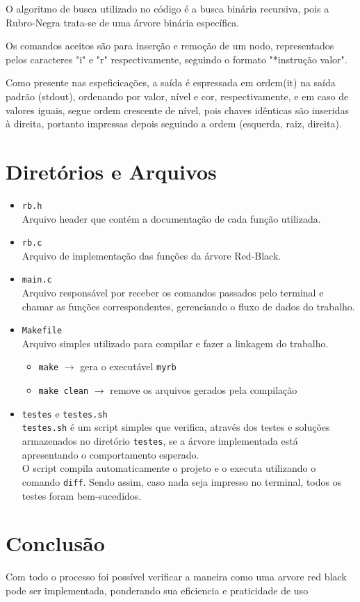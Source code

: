 \documentclass{article}
\begin{document}
    O algoritmo de busca utilizado no código é a busca binária recursiva, pois a Rubro-Negra trata-se de uma árvore binária específica. 

    Os comandos aceitos são para inserção e remoção de um nodo, representados pelos caracteres "i" e "r" respectivamente, seguindo o formato "*instrução valor". 

    Como presente nas espeficicações, a saída é espressada em ordem(it) na saída padrão (stdout), ordenando por valor, nível e cor, respectivamente, e em caso de valores iguais, segue ordem crescente de nível, pois chaves idênticas são inseridas à direita, portanto impressas depois seguindo a ordem (esquerda, raiz, direita).


    \section{Diretórios e Arquivos}

    \begin{itemize}
        \item \texttt{rb.h} \\
        Arquivo header que contém a documentação de cada função utilizada.
        
        \item \texttt{rb.c} \\
        Arquivo de implementação das funções da árvore Red-Black.
        
        \item \texttt{main.c} \\
        Arquivo responsável por receber os comandos passados pelo terminal e chamar as funções correspondentes, gerenciando o fluxo de dados do trabalho.
        
        \item \texttt{Makefile} \\
        Arquivo simples utilizado para compilar e fazer a linkagem do trabalho.
        \begin{itemize}
            \item \texttt{make} \( \rightarrow \) gera o executável \texttt{myrb}
            \item \texttt{make clean} \( \rightarrow \) remove os arquivos gerados pela compilação
        \end{itemize}
        
        \item \texttt{testes} e \texttt{testes.sh} \\
        \texttt{testes.sh} é um script simples que verifica, através dos testes e soluções armazenados no diretório \texttt{testes}, se a árvore implementada está apresentando o comportamento esperado.\\
        O script compila automaticamente o projeto e o executa utilizando o comando \texttt{diff}. Sendo assim, caso nada seja impresso no terminal, todos os testes foram bem-sucedidos.
    \end{itemize}

        
    \section{Conclusão}

    Com todo o processo foi possível verificar a maneira como uma arvore red black pode ser implementada, ponderando sua eficiencia e praticidade de uso 
\end{document}
